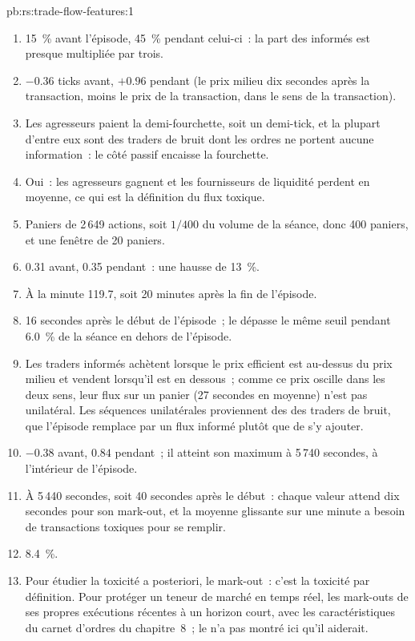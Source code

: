 \begin{solution}{pb:rs:trade-flow-features:1}
\begin{enumerate}
\item 15~\% avant l'épisode, 45~\% pendant celui-ci~: la part des informés est presque multipliée par trois.
\item $-0.36$ ticks avant, $+0.96$ pendant (le prix milieu dix secondes après la transaction, moins le prix de la transaction, dans le sens de la transaction).
\item Les agresseurs paient la demi-fourchette, soit un demi-tick, et la plupart d'entre eux sont des traders de bruit dont les ordres ne portent aucune information~: le
côté passif encaisse la fourchette.
\item Oui~: les agresseurs gagnent et les fournisseurs de liquidité perdent en moyenne, ce qui est la définition du flux toxique.
\item Paniers de 2\,649 actions, soit $1/400$ du volume de la séance, donc 400 paniers, et une fenêtre de 20 paniers.
\item 0.31 avant, 0.35 pendant~: une hausse de 13~\%.
\item À la minute 119.7, soit 20 minutes après la fin de l'épisode.
\item 16 secondes après le début de l'épisode~; le  dépasse le même seuil pendant 6.0~\% de la séance en dehors de l'épisode.
\item Les traders informés achètent lorsque le prix efficient est au-dessus du prix milieu et vendent lorsqu'il est en dessous~; comme ce prix oscille dans les deux sens, leur flux
sur un panier (27 secondes en moyenne) n'est pas unilatéral. Les séquences unilatérales proviennent des  des traders de bruit, que l'épisode remplace
par un flux informé plutôt que de s'y ajouter.
\item $-0.38$ avant, $0.84$ pendant~; il atteint son maximum à 5\,740 secondes, à l'intérieur de l'épisode.
\item À 5\,440 secondes, soit 40 secondes après le début~: chaque valeur attend dix secondes pour son mark-out, et la moyenne glissante sur une minute a besoin
de transactions toxiques pour se remplir.
\item 8.4~\%.
\item Pour étudier la toxicité a posteriori, le mark-out~: c'est la toxicité par définition. Pour protéger un teneur de marché en temps réel, les mark-outs
de ses propres exécutions récentes à un horizon court, avec les caractéristiques du carnet d'ordres du chapitre~8~; le  n'a pas montré ici qu'il aiderait.

\end{enumerate}
\end{solution}
